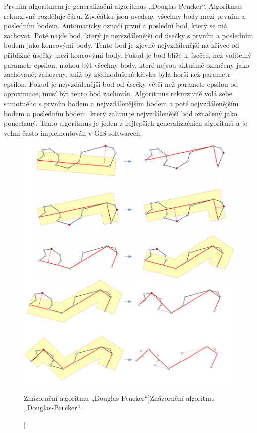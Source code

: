 Prvním algoritmem je generalizační algoritmus „Douglas-Peucker“. Algoritmus rekurzivně rozděluje čáru.
Zpočátku jsou uvedeny všechny body mezi prvním a posledním bodem. Automaticky označí první a poslední bod,
který se má zachovat. Poté najde bod, který je nejvzdálenější od úsečky s prvním a posledním bodem 
jako koncovými body. Tento bod je zjevně nejvzdálenější na křivce od přibližné úsečky mezi koncovými body. 
Pokud je bod blíže k úsečce, než volitelný parametr epsilon, mohou být všechny body, které nejsou aktuálně označeny jako zachované, 
zahozeny, aniž by zjednodušená křivka byla horší než parametr epsilon. Pokud je nejvzdálenější bod od úsečky větší než parametr epsilon od aproximace,
musí být tento bod zachován. Algoritmus rekurzivně volá sebe samotného s prvním bodem a nejvzdálenějším bodem 
a poté nejvzdálenějším bodem a posledním bodem, který zahrnuje nejvzdálenější bod označený jako ponechaný. 
Tento algoritmus je jeden z nejlepších generalizačních algoritmů a je velmi často
implementován v GIS softwarech. \cite{bayer-douglas}

\begin{figure}[H] \centering
    \includegraphics[width=400pt]{./pictures/douglas.png}
    \caption[Znázornění algoritmu „Douglas-Peucker“]{Znázornění algoritmu „Douglas-Peucker“ \cite{bayer-douglas}}
	\label{fig:douglas}              
\end{figure} 

